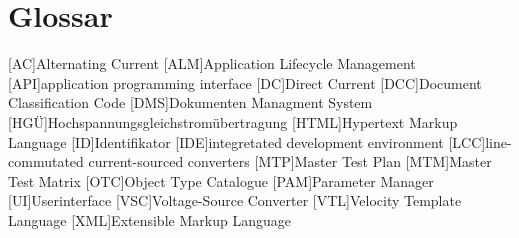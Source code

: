\chapter*{Glossar}
%
%

\label{cha:glossar}
\thispagestyle{empty}
\vspace{1cm}

\begin{acronym}[HTML] %
	[AC]{Alternating Current}
	[ALM]{Application Lifecycle Management}
	[API]{application programming interface}
	[DC]{Direct Current}
	[DCC]{Document Classification Code}
	[DMS]{Dokumenten Managment System}
	[HGÜ]{Hochspannungsgleichstromübertragung}
	[HTML]{Hypertext Markup Language}
	[ID]{Identifikator}
	[IDE]{integretated development environment}
	[LCC]{line-commutated current-sourced converters}
	[MTP]{Master Test Plan}
	[MTM]{Master Test Matrix}
	[OTC]{Object Type Catalogue}
	[PAM]{Parameter Manager}
	[UI]{Userinterface}
	[VSC]{Voltage-Source Converter}
	[VTL]{Velocity Template Language}
	[XML]{Extensible Markup Language}
\end{acronym}